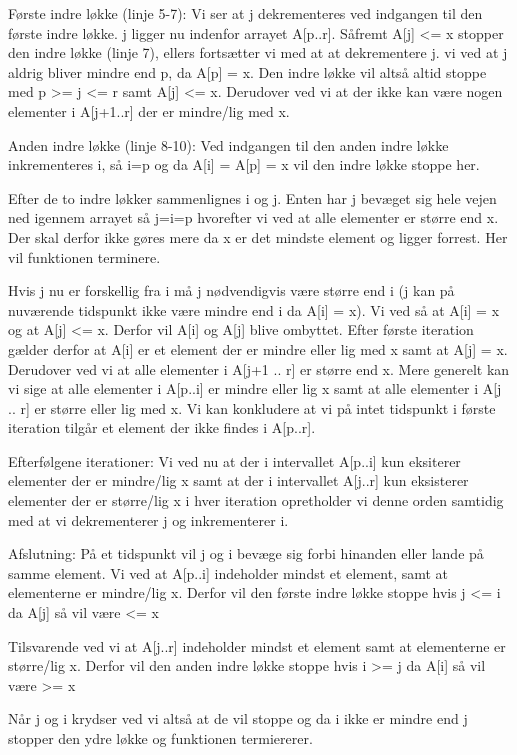 Første indre løkke (linje 5-7):
Vi ser at j dekrementeres ved indgangen til den første indre løkke. j ligger nu indenfor arrayet A[p..r]. 
Såfremt A[j] <= x stopper den indre løkke (linje 7), ellers fortsætter vi med at at dekrementere j.
vi ved at j aldrig bliver mindre end p, da A[p] = x. Den indre løkke vil altså altid stoppe med p >= j <= r samt A[j] <= x.
Derudover ved vi at der ikke kan være nogen elementer i A[j+1..r] der er mindre/lig med x.
 
Anden indre løkke (linje 8-10):
Ved indgangen til den anden indre løkke inkrementeres i, så i=p og da A[i] = A[p] = x vil den indre løkke stoppe her.

Efter de to indre løkker sammenlignes i og j.
Enten har j bevæget sig hele vejen ned igennem arrayet så j=i=p hvorefter vi ved at alle elementer er større end x. Der skal derfor ikke gøres mere da x er det mindste element og ligger forrest. Her vil funktionen terminere.

Hvis j nu er forskellig fra i må j nødvendigvis være større end i (j kan på nuværende tidspunkt ikke være mindre end i da A[i] = x).
Vi ved så at A[i] = x og at A[j] <= x. Derfor vil A[i] og A[j] blive ombyttet.
Efter første iteration gælder derfor at A[i] er et element der er mindre eller lig med x samt at A[j] = x. Derudover ved vi at alle elementer i A[j+1 .. r] er større end x.
Mere generelt kan vi sige at alle elementer i A[p..i] er mindre eller lig x samt at alle elementer i A[j .. r] er større eller lig med x.
Vi kan konkludere at vi på intet tidspunkt i første iteration tilgår et element der ikke findes i A[p..r].


Efterfølgene iterationer:
Vi ved nu at der i intervallet A[p..i] kun eksiterer elementer der er mindre/lig x samt at der i intervallet A[j..r] kun eksisterer elementer der er større/lig x
i hver iteration opretholder vi denne orden samtidig med at vi dekrementerer j og inkrementerer i.


Afslutning:
På et tidspunkt vil j og i bevæge sig forbi hinanden eller lande på samme element. 
Vi ved at A[p..i] indeholder mindst et element, samt at elementerne er mindre/lig x. Derfor vil den første indre løkke stoppe hvis j <= i da A[j] så vil være <= x

Tilsvarende ved vi at A[j..r] indeholder mindst et element samt at elementerne er større/lig x. Derfor vil den anden indre løkke stoppe hvis i >= j da A[i] så vil være >= x

Når j og i krydser ved vi altså at de vil stoppe og da i ikke er mindre end j stopper den ydre løkke og funktionen termiererer. 



